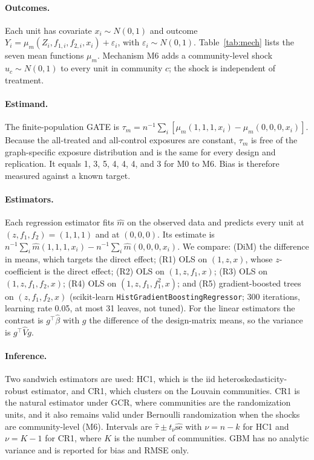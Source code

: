 \documentclass{article}
\begin{document}
\paragraph{Outcomes.} Each unit has covariate $x_i\sim N(0,1)$ and outcome $Y_i=\mu_m(Z_i,f_{1,i},f_{2,i},x_i)+\varepsilon_i$, with $\varepsilon_i\sim N(0,1)$. Table~\ref{tab:mech} lists the seven mean functions $\mu_m$. Mechanism M6 adds a community-level shock $u_c\sim N(0,1)$ to every unit in community $c$; the shock is independent of treatment.

\begin{table}[t]
\caption{Outcome mechanisms. $x$ is a covariate, $z$ the unit's own treatment, $f_1$ and $f_2$ the one-hop and two-step exposures; GATE is the exact finite-population value.}
\label{tab:mech}
\centering
\small

\end{table}

\paragraph{Estimand.} The finite-population GATE is $\tau_m=n^{-1}\sum_i[\mu_m(1,1,1,x_i)-\mu_m(0,0,0,x_i)]$. Because the all-treated and all-control exposures are constant, $\tau_m$ is free of the graph-specific exposure distribution and is the same for every design and replication. It equals 1, 3, 5, 4, 4, 4, and 3 for M0 to M6. Bias is therefore measured against a known target.

\paragraph{Estimators.} Each regression estimator fits $\hat m$ on the observed data and predicts every unit at $(z,f_1,f_2)=(1,1,1)$ and at $(0,0,0)$. Its estimate is $n^{-1}\sum_i \hat m(1,1,1,x_i)-n^{-1}\sum_i\hat m(0,0,0,x_i)$. We compare: (DiM) the difference in means, which targets the direct effect; (R1) OLS on $(1,z,x)$, whose $z$-coefficient is the direct effect; (R2) OLS on $(1,z,f_1,x)$; (R3) OLS on $(1,z,f_1,f_2,x)$; (R4) OLS on $(1,z,f_1,f_1^2,x)$; and (R5) gradient-boosted trees on $(z,f_1,f_2,x)$ (scikit-learn \texttt{HistGradientBoostingRegressor}; 300 iterations, learning rate 0.05, at most 31 leaves, not tuned). For the linear estimators the contrast is $g^\top\hat\beta$ with $g$ the difference of the design-matrix means, so the variance is $g^\top\hat V g$.

\paragraph{Inference.} Two sandwich estimators are used: HC1, which is the iid heteroskedasticity-robust estimator, and CR1, which clusters on the Louvain communities. CR1 is the natural estimator under GCR, where communities are the randomization units, and it also remains valid under Bernoulli randomization when the shocks are community-level (M6). Intervals are $\hat\tau\pm t_{\nu}\widehat{\mathrm{se}}$ with $\nu=n-k$ for HC1 and $\nu=K-1$ for CR1, where $K$ is the number of communities. GBM has no analytic variance and is reported for bias and RMSE only.
\end{document}
